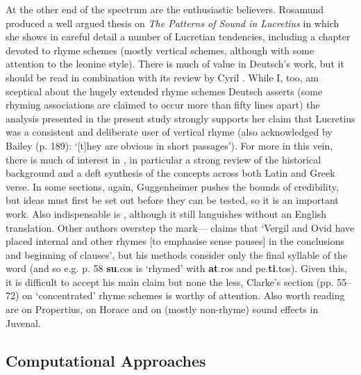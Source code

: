 \documentclass[twocolumn, switch]{article} %
\begin{document}
At the other end of the spectrum are the enthusiastic believers. Rosamund
 produced a well argued thesis on \emph{The Patterns of
Sound in Lucretius} in which she shows in careful detail a number of Lucretian
tendencies, including a chapter devoted to rhyme schemes (mostly vertical
schemes, although with some attention to the leonine style). There is much of
value in Deutsch's work, but it should be read in combination with its review
by Cyril . While I, too, am sceptical about the
hugely extended rhyme schemes Deutsch asserts (some rhyming associations are
claimed to occur more than fifty lines apart) the analysis presented in the
present study strongly supports her claim that Lucretius was a consistent and
deliberate user of vertical rhyme (also acknowledged by Bailey (p. 189):
`[t]hey are obvious in short passages'). For more in this vein, there is much
of interest in , in particular a strong review
of the historical background and a deft synthesis of the concepts across both
Latin and Greek verse. In some sections, again, Guggenheimer pushes the bounds
of credibility, but ideas must first be set out before they can be tested, so
it is an important work. Also indispensable is ,
although it still languishes without an English translation. Other authors
overstep the mark--- claims that `Vergil
and Ovid have \textellipsis placed internal and other rhymes [to emphasise
sense pauses] in the conclusions and beginning of clauses', but his methods
consider only the final syllable of the word (and so e.g. p. 58
\textbf{su}.cos is `rhymed' with \textbf{at}.ros and pe.\textbf{ti}.tos).
Given this, it is difficult to accept his main claim but none the less,
Clarke's section (pp. 55--72) on `concentrated' rhyme schemes is worthy of
attention. Also worth reading are  on Propertius,
 on Horace and  on
(mostly non-rhyme) sound effects in Juvenal.

\subsection{Computational Approaches}
\end{document}
